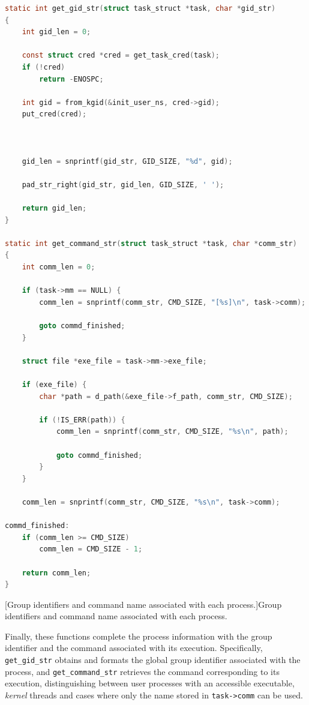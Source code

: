 \begin{lstlisting}[language=C]
static int get_gid_str(struct task_struct *task, char *gid_str)
{
	int gid_len = 0;

	const struct cred *cred = get_task_cred(task);
	if (!cred)
		return -ENOSPC;

	int gid = from_kgid(&init_user_ns, cred->gid);
	put_cred(cred);



	gid_len = snprintf(gid_str, GID_SIZE, "%d", gid);

	pad_str_right(gid_str, gid_len, GID_SIZE, ' ');

	return gid_len;
}

static int get_command_str(struct task_struct *task, char *comm_str)
{
	int comm_len = 0;

	if (task->mm == NULL) {
		comm_len = snprintf(comm_str, CMD_SIZE, "[%s]\n", task->comm);

		goto commd_finished;
	}

	struct file *exe_file = task->mm->exe_file;

	if (exe_file) {
		char *path = d_path(&exe_file->f_path, comm_str, CMD_SIZE);

		if (!IS_ERR(path)) {
			comm_len = snprintf(comm_str, CMD_SIZE, "%s\n", path);

			goto commd_finished;
		}
	}

	comm_len = snprintf(comm_str, CMD_SIZE, "%s\n", task->comm);

commd_finished:
	if (comm_len >= CMD_SIZE)
		comm_len = CMD_SIZE - 1;

	return comm_len;
}
\end{lstlisting}
\captionsetup{type=code,justification=centering,singlelinecheck=false}
[Group identifiers and command name associated with each process.]{Group identifiers and command name associated with each process.}
\label{cod:report_gid_command}
\vspace{\baselineskip}

Finally, these functions complete the process information with the group identifier and the command associated with its execution.
Specifically, \verb|get_gid_str| obtains and formats the global group identifier associated with the process, and \verb|get_command_str| retrieves the command corresponding to its execution, distinguishing between user processes with an accessible executable, \textit{kernel} threads and cases where only the name stored in \verb|task->comm| can be used.\\

